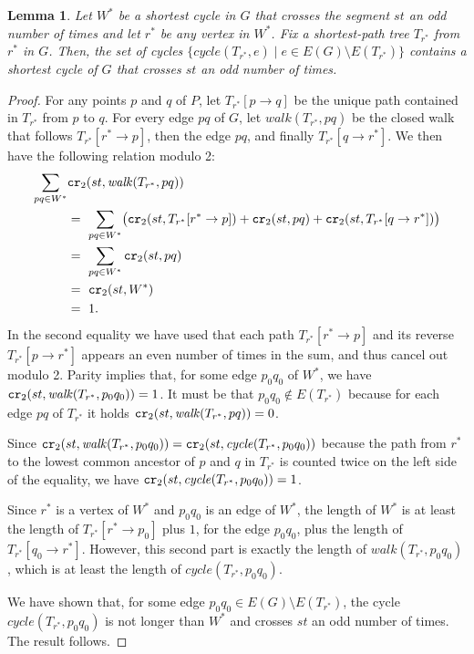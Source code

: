 \documentclass[a4paper,11pt]{article}
\newtheorem{lemma}[theorem]{Lemma}
\newcommand{\cycle}{\mathit{cycle}}
\newcommand{\walk}{\mathit{walk}}
\newcommand\CR{\mbox{\tt cr}_2}		  %
\begin{document}
\begin{lemma}
	Let $W^*$ be a shortest cycle in $G$ that crosses the segment 
	$st$ an odd number of times and let $r^*$ be any vertex in $W^*$.
	Fix a shortest-path tree $T_{r^*}$ from $r^*$ in $G$.
	Then, the set of cycles $\{ \cycle(T_{r^*},e)\mid e\in E(G)\setminus E(T_{r^*})\}$
	contains a shortest cycle of $G$ that crosses $st$ an odd number of times.
\end{lemma}
\begin{proof}
	For any points $p$ and $q$ of $P$, let $T_{r^*}[p \rightarrow q]$ be the 
	unique path contained in $T_{r^*}$ from $p$ to $q$.
	For every edge $pq$ of $G$, let $\walk(T_{r^*},pq)$ be the closed walk that follows 
	$T_{r^*}[r^*\rightarrow p]$, then the edge $pq$, and finally $T_{r^*}[q\rightarrow r^*]$.
	We then have the following relation modulo 2:
	\begin{align*}
		\sum_{pq\in W^*}& \CR(st,\walk(T_{r^*},pq)) \\ 
		&=~ 
		\sum_{pq\in W^*} \bigl( \CR(st,T_{r^*}[r^* \rightarrow p])+ \CR(st,pq) + 
						\CR(st,T_{r^*}[q \rightarrow r^*]) \bigr) \\
		&=~ \sum_{pq\in W^*} \CR(st,pq)  \\
		&=~ \CR(st,W^*) \\
		&=~ 1. 		
	\end{align*}
	In the second equality we have used that each path
	$T_{r^*}[r^*\rightarrow p]$ and its reverse $T_{r^*}[p\rightarrow r^*]$ 
	appears an even number of times in the sum,
	and thus cancel out modulo 2.
	Parity implies that, for some edge $p_0q_0$ of $W^*$, 
	we have $\CR(st,\walk(T_{r^*},p_0q_0))=1$.
	It must be that $p_0q_0\notin E(T_{r^*})$ because for each edge $pq$ of $T_{r^*}$
	it holds $\CR(st,\walk(T_{r^*},pq))=0$.
	
	Since $\CR(st,\walk(T_{r^*},p_0q_0))= \CR(st,\cycle(T_{r^*},p_0q_0))$ 
	because the path from $r^*$ to the lowest common ancestor of $p$ and $q$ in $T_{r^*}$ 
	is counted twice on the left side of the equality, 
	we have $\CR(st,\cycle(T_{r^*},p_0q_0))=1$. 

	Since $r^*$ is a vertex of $W^*$ and $p_0q_0$ is an edge of $W^*$,
	the length of $W^*$ is at least the length of $T_{r^*}[r^* \rightarrow p_0]$ plus $1$,
	for the edge $p_0q_0$,
	plus the length of $T_{r^*}[q_0 \rightarrow r^*]$. However, this second part
	is exactly the length of $\walk(T_{r^*},p_0q_0)$, which is at least the length of 
	$\cycle(T_{r^*},p_0q_0)$.

	We have shown that, for some edge $p_0q_0\in E(G)\setminus E(T_{r^*})$,
	the cycle $\cycle(T_{r^*},p_0q_0)$ is not longer than $W^*$ 
	and crosses $st$ an odd number of times. The result follows.
\end{proof}
\end{document}
